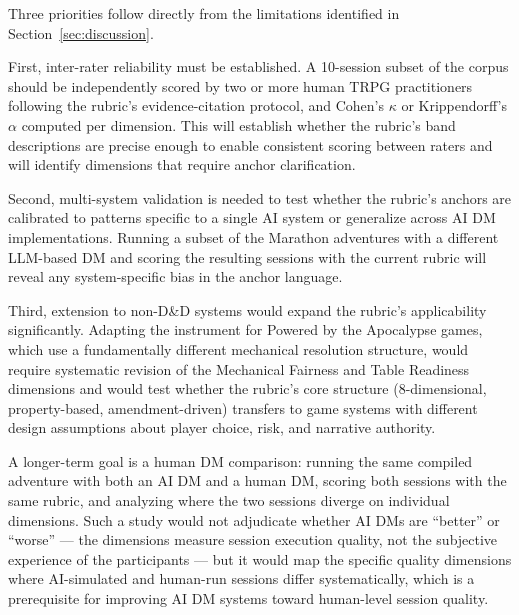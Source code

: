 Three priorities follow directly from the limitations identified in
Section~\ref{sec:discussion}.

First, inter-rater reliability must be established. A 10-session subset of the corpus
should be independently scored by two or more human TRPG practitioners following the
rubric's evidence-citation protocol, and Cohen's $\kappa$ or Krippendorff's $\alpha$
computed per dimension. This will establish whether the rubric's band descriptions are
precise enough to enable consistent scoring between raters and will identify dimensions
that require anchor clarification.

Second, multi-system validation is needed to test whether the rubric's anchors are
calibrated to patterns specific to a single AI system or generalize across AI DM
implementations. Running a subset of the Marathon adventures with a different LLM-based
DM and scoring the resulting sessions with the current rubric will reveal any
system-specific bias in the anchor language.

Third, extension to non-D\&D systems would expand the rubric's applicability
significantly. Adapting the instrument for Powered by the Apocalypse games, which use
a fundamentally different mechanical resolution structure, would require systematic
revision of the Mechanical Fairness and Table Readiness dimensions and would test
whether the rubric's core structure (8-dimensional, property-based, amendment-driven)
transfers to game systems with different design assumptions about player choice, risk,
and narrative authority.

A longer-term goal is a human DM comparison: running the same compiled adventure with
both an AI DM and a human DM, scoring both sessions with the same rubric, and analyzing
where the two sessions diverge on individual dimensions. Such a study would not
adjudicate whether AI DMs are ``better'' or ``worse'' --- the dimensions measure session
execution quality, not the subjective experience of the participants --- but it would
map the specific quality dimensions where AI-simulated and human-run sessions differ
systematically, which is a prerequisite for improving AI DM systems toward human-level
session quality.
